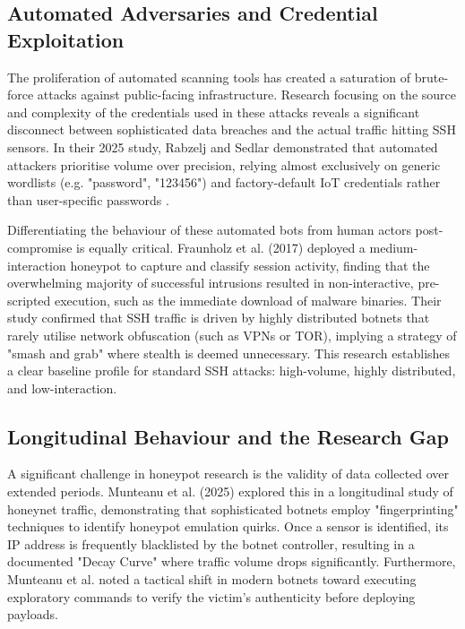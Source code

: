 \documentclass[]{article}
\begin{document}
\subsection{Automated Adversaries and Credential Exploitation}

The proliferation of automated scanning tools has created a saturation of brute-force attacks against public-facing infrastructure. Research focusing on the source and complexity of the credentials used in these attacks reveals a significant disconnect between sophisticated data breaches and the actual traffic hitting SSH sensors. In their 2025 study, Rabzelj and Sedlar demonstrated that automated attackers prioritise volume over precision, relying almost exclusively on generic wordlists (e.g. "password", "123456") and factory-default IoT credentials rather than user-specific passwords \cite{rabzelj2025beyond}.

Differentiating the behaviour of these automated bots from human actors post-compromise is equally critical. Fraunholz et al. (2017) \cite{fraunholz2017investigation} deployed a medium-interaction honeypot to capture and classify session activity, finding that the overwhelming majority of successful intrusions resulted in non-interactive, pre-scripted execution, such as the immediate download of malware binaries. Their study confirmed that SSH traffic is driven by highly distributed botnets that rarely utilise network obfuscation (such as VPNs or TOR), implying a strategy of "smash and grab" where stealth is deemed unnecessary. This research establishes a clear baseline profile for standard SSH attacks: high-volume, highly distributed, and low-interaction.

\subsection{Longitudinal Behaviour and the Research Gap}

A significant challenge in honeypot research is the validity of data collected over extended periods. Munteanu et al. (2025) \cite{munteanu2025attacks} explored this in a longitudinal study of honeynet traffic, demonstrating that sophisticated botnets employ "fingerprinting" techniques to identify honeypot emulation quirks. Once a sensor is identified, its IP address is frequently blacklisted by the botnet controller, resulting in a documented "Decay Curve" where traffic volume drops significantly. Furthermore, Munteanu et al. noted a tactical shift in modern botnets toward executing exploratory commands to verify the victim's authenticity before deploying payloads.
\end{document}
